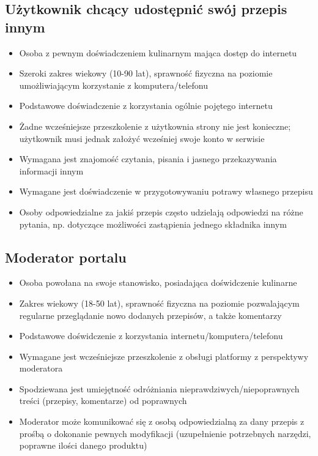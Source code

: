 \documentclass{article}
\begin{document}
\subsection{Użytkownik chcący udostępnić swój przepis innym}
  \begin{itemize}
    \item Osoba z pewnym doświadczeniem kulinarnym mająca dostęp do internetu
    \item Szeroki zakres wiekowy (10-90 lat), sprawność fizyczna na poziomie umożliwiającym korzystanie z komputera/telefonu
    \item Podstawowe doświadczenie z korzystania ogólnie pojętego internetu
    \item Żadne wcześniejsze przeszkolenie z użytkownia strony nie jest konieczne; użytkownik musi jednak założyć wcześniej swoje konto w serwisie
    \item Wymagana jest znajomość czytania, pisania i jasnego przekazywania informacji innym
    \item Wymagane jest doświadczenie w przygotowywaniu potrawy własnego przepisu
    \item Osoby odpowiedzialne za jakiś przepis często udzielają odpowiedzi na różne pytania, np. dotyczące możliwości zastąpienia jednego składnika innym
  \end{itemize}
\subsection{Moderator portalu}
  \begin{itemize}    
    \item Osoba powołana na swoje stanowisko, posiadająca doświdczenie kulinarne
    \item Zakres wiekowy (18-50 lat), sprawność fizyczna na poziomie pozwalającym regularne przeglądanie nowo dodanych przepisów, a także komentarzy
    \item Podstawowe doświdczenie z korzystania internetu/komputera/telefonu
    \item Wymagane jest wcześniejsze przeszkolenie z obsługi platformy z perspektywy moderatora
    \item Spodziewana jest umiejętność odróżniania nieprawdziwych/niepoprawnych treści (przepisy, komentarze) od poprawnych 
    \item Moderator może komunikować się z osobą odpowiedzialną za dany przepis z prośbą o dokonanie pewnych modyfikacji (uzupełnienie potrzebnych narzędzi, poprawne ilości danego produktu)
  \end{itemize}
\newpage
\end{document}
